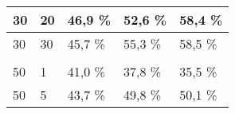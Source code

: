 \begin{table}[!htb]
\begin{tabular}{lllll}
\multicolumn{1}{|l|}{30}                                                     & \multicolumn{1}{l|}{20}                                                                                                       & \multicolumn{1}{l|}{46,9 \%}                                                                                          & \multicolumn{1}{l|}{52,6 \%}                                                                                           & \multicolumn{1}{l|}{58,4 \%}                                                                                           \\ \hline
\multicolumn{1}{|l|}{30}                                                     & \multicolumn{1}{l|}{30}                                                                                                       & \multicolumn{1}{l|}{45,7 \%}                                                                                          & \multicolumn{1}{l|}{55,3 \%}                                                                                           & \multicolumn{1}{l|}{58,5 \%}                                                                                           \\ \hline
                                                                             &                                                                                                                               &                                                                                                                       &                                                                                                                        &                                                                                                                        \\ \hline
\multicolumn{1}{|l|}{50}                                                     & \multicolumn{1}{l|}{1}                                                                                                        & \multicolumn{1}{l|}{41,0 \%}                                                                                          & \multicolumn{1}{l|}{37,8 \%}                                                                                           & \multicolumn{1}{l|}{35,5 \%}                                                                                           \\ \hline
\multicolumn{1}{|l|}{50}                                                     & \multicolumn{1}{l|}{5}                                                                                                        & \multicolumn{1}{l|}{43,7 \%}                                                                                          & \multicolumn{1}{l|}{49,8 \%}                                                                                           & \multicolumn{1}{l|}{50,1 \%}                                                                                           \\ \hline

\end{tabular}
\end{table}
